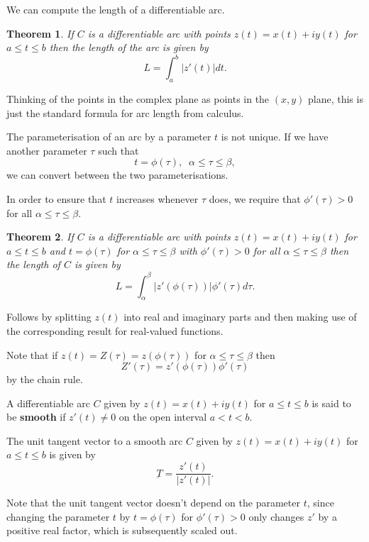 \documentclass[a4paper,10pt]{article}
\newtheorem{theorem}{Theorem}[section]
\newenvironment{definition}[1][Definition]{\begin{trivlist}
\item[\hskip \labelsep {\bfseries #1}]}{\end{trivlist}}
\begin{document}
We can compute the length of a differentiable arc.

\begin{theorem}
If $C$ is a differentiable arc with points $z(t) = x(t) + iy(t)$ for $a \leq t \leq b$ then the length of the arc is given by
$$L = \int_a^b \left|z'(t)\right| dt.$$
\end{theorem}

Thinking of the points in the complex plane as points in the $(x, y)$ plane, this is just the standard formula for arc length from calculus.

The parameterisation of an arc by a parameter $t$ is not unique. If we have another parameter $\tau$ such that
$$t = \phi(\tau), \;\; \alpha \leq \tau \leq \beta,$$
we can convert between the two parameterisations.

In order to ensure that $t$ increases whenever $\tau$ does, we require that $\phi'(\tau) > 0$ for all $\alpha \leq \tau \leq \beta$.

\begin{theorem}
If $C$ is a differentiable arc with points $z(t) = x(t) + iy(t)$ for $a \leq t \leq b$ and $t = \phi(\tau)$ for $\alpha \leq \tau \leq \beta$ with $\phi'(\tau) > 0$ for all $\alpha \leq \tau \leq \beta$ then the length of $C$ is given by
$$L = \int_{\alpha}^\beta \left|z'(\phi(\tau))\right|\phi'(\tau)d\tau.$$
\end{theorem}

Follows by splitting $z(t)$ into real and imaginary parts and then making use of the corresponding result for real-valued functions.

Note that if $z(t) = Z(\tau) = z(\phi(\tau))$ for $\alpha \leq \tau \leq \beta$ then
$$Z'(\tau) = z'(\phi(\tau))\phi'(\tau)$$
by the chain rule.

\begin{definition}
A differentiable arc $C$ given by $z(t) = x(t) + iy(t)$ for $a \leq t \leq b$ is said to be \textbf{smooth} if $z'(t) \neq 0$ on the open interval $a < t < b$.
\end{definition}

\begin{definition}
The unit tangent vector to a smooth arc $C$ given by $z(t) = x(t) + iy(t)$ for $a \leq t \leq b$ is given by
$$\underbar{T} = \frac{z'(t)}{|z'(t)|}.$$
\end{definition}

Note that the unit tangent vector doesn't depend on the parameter $t$, since changing the parameter $t$ by $t = \phi(\tau)$ for $\phi'(\tau) > 0$ only changes $z'$ by a positive real factor, which is subsequently scaled out.
\end{document}
